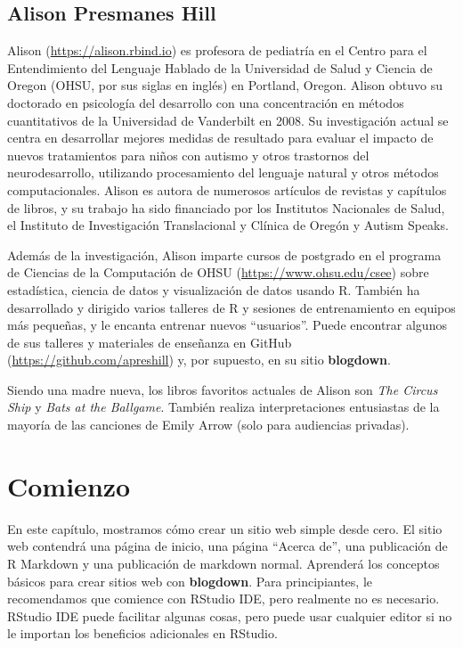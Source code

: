 \documentclass[12pt,]{krantz}
\theoremstyle{definition}
\theoremstyle{definition}
\theoremstyle{definition}
\theoremstyle{remark}
\begin{document}
\hypertarget{alison-presmanes-hill}{%
\section*{Alison Presmanes Hill}\label{alison-presmanes-hill}}


Alison (\url{https://alison.rbind.io}) es profesora de pediatría en el
Centro para el Entendimiento del Lenguaje Hablado de la Universidad de
Salud y Ciencia de Oregon (OHSU, por sus siglas en inglés) en Portland,
Oregon. Alison obtuvo su doctorado en psicología del desarrollo con una
concentración en métodos cuantitativos de la Universidad de Vanderbilt
en 2008. Su investigación actual se centra en desarrollar mejores
medidas de resultado para evaluar el impacto de nuevos tratamientos para
niños con autismo y otros trastornos del neurodesarrollo, utilizando
procesamiento del lenguaje natural y otros métodos computacionales.
Alison es autora de numerosos artículos de revistas y capítulos de
libros, y su trabajo ha sido financiado por los Institutos Nacionales de
Salud, el Instituto de Investigación Translacional y Clínica de Oregón y
Autism Speaks.

Además de la investigación, Alison imparte cursos de postgrado en el
programa de Ciencias de la Computación de OHSU
(\url{https://www.ohsu.edu/csee}) sobre estadística, ciencia de datos y
visualización de datos usando R. También ha desarrollado y dirigido
varios talleres de R y sesiones de entrenamiento en equipos más
pequeñas, y le encanta entrenar nuevos ``usuarios''. Puede encontrar
algunos de sus talleres y materiales de enseñanza en GitHub
(\url{https://github.com/apreshill}) y, por supuesto, en su sitio
\textbf{blogdown}.

Siendo una madre nueva, los libros favoritos actuales de Alison son
\emph{The Circus Ship} y \emph{Bats at the Ballgame}. También realiza
interpretaciones entusiastas de la mayoría de las canciones de Emily
Arrow (solo para audiencias privadas).

\mainmatter

\hypertarget{comienzo}{%
\chapter{Comienzo}\label{comienzo}}

En este capítulo, mostramos cómo crear un sitio web simple desde cero.
El sitio web contendrá una página de inicio, una página ``Acerca de'',
una publicación de R Markdown y una publicación de markdown normal.
Aprenderá los conceptos básicos para crear sitios web con
\textbf{blogdown}. Para principiantes, le recomendamos que comience con
RStudio IDE, pero realmente no es necesario. RStudio IDE puede facilitar
algunas cosas, pero puede usar cualquier editor si no le importan los
beneficios adicionales en RStudio.
\end{document}
